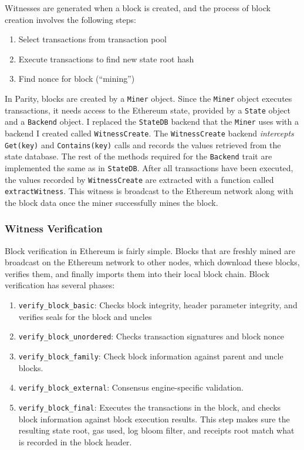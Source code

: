 \documentclass[12pt]{article}
\begin{document}
Witnesses are generated when a block is created, and the process of block creation involves the following steps:
\begin{enumerate}
  \item Select transactions from transaction pool
  \item Execute transactions to find new state root hash
  \item Find nonce for block (``mining'')
\end{enumerate}
In Parity, blocks are created by a \texttt{Miner} object. Since the \texttt{Miner} object executes transactions, it needs access to the Ethereum state, provided by a \texttt{State} object and a \texttt{Backend} object. I replaced the \texttt{StateDB} backend that the \texttt{Miner} uses with a backend I created called \texttt{WitnessCreate}. The \texttt{WitnessCreate} backend \emph{intercepts} \texttt{Get(key)} and \texttt{Contains(key)} calls and records the values retrieved from the state database. The rest of the methods required for the \texttt{Backend} trait are implemented the same as in \texttt{StateDB}. After all transactions have been executed, the values recorded by \texttt{WitnessCreate} are extracted with a function called \texttt{extractWitness}. This witness is broadcast to the Ethereum network along with the block data once the miner successfully mines the block.

\subsubsection{Witness Verification}

Block verification in Ethereum is fairly simple. Blocks that are freshly mined are broadcast on the Ethereum network to other nodes, which download these blocks, verifies them, and finally imports them into their local block chain. Block verification has several phases:
\begin{enumerate}
  \item \texttt{verify\_block\_basic}: Checks block integrity, header parameter integrity, and verifies seals for the block and uncles
  \item \texttt{verify\_block\_unordered}: Checks transaction signatures and block nonce
  \item \texttt{verify\_block\_family}: Check block information against parent and uncle blocks.
  \item \texttt{verify\_block\_external}: Consensus engine-specific validation.
  \item \texttt{verify\_block\_final}: Executes the transactions in the block, and checks block information against block execution results. This step makes sure the resulting state root, gas used, log bloom filter, and receipts root match what is recorded in the block header.
\end{enumerate}
\end{document}
